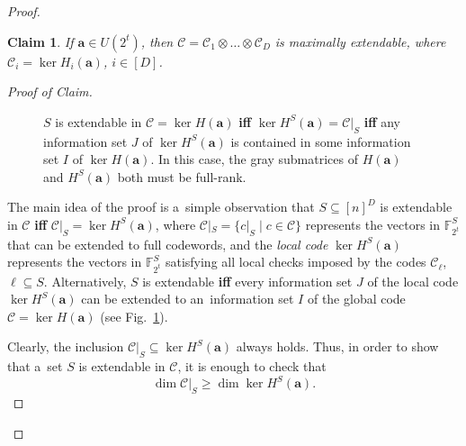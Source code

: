 \documentclass[conference]{IEEEtran}
\newcommand{\Iff}{\textbf{if\textcompwordmark f} }
\let\ge\geqslant
\theoremstyle{plain}
\newtheorem{claim}{Claim}[theorem]
\theoremstyle{definition}
\theoremstyle{remark}
\newcommand{\va}{\mathbf{a}}
\newcommand{\cC}{\mathcal{C}}
\newcommand{\F}{\mathbb{F}}
\begin{document}
\begin{proof}
    \begin{claim}\label{cl:MR-universal}
        If $\va\in U(2^t)$, then $\cC=\cC_1\otimes\dots \otimes \cC_D$ is maximally extendable, where $\cC_i = \ker H_i(\va)$, $i\in [D]$.
    \end{claim}
    \begin{proof}[Proof of Claim]
    \begin{figure}
        \centering
{}
        \caption{$S$ is extendable in $\cC=\ker H(\va)$ \Iff $\ker H^S(\va) = \cC|_S$ \Iff any information set $J$ of $\ker H^S(\va)$ is contained in some information set $I$ of $\ker H(\va)$. 
        In this case, the gray submatrices of $H(\va)$ and $H^S(\va)$ both must be full-rank.}
        \label{fig:extendable}
    \end{figure}

    The main idea of the proof is a~simple observation that $S\subseteq [n]^D$ is extendable in $\cC$ \Iff $\cC|_S = \ker H^S(\va)$, where $\cC|_S = \{c|_S \mid c \in \cC\}$ represents the vectors in $\F_{2^t}^S$ that can be extended to full codewords, and the \emph{local code} $\ker H^S(\va)$ represents the vectors in $\F_{2^t}^S$ satisfying all local checks imposed by the codes $\cC_\ell$, $\ell \subseteq S$. Alternatively, $S$ is extendable \Iff every information set $J$ of the local code $\ker H^S(\va)$ can be extended to an~information set $I$ of the global code $\cC = \ker H(\va)$ (see Fig.~\ref{fig:extendable}). 

    Clearly, the inclusion $\cC|_S \subseteq \ker H^S(\va)$ always holds. Thus, in order to show that a~set $S$ is extendable in $\cC$, it is enough to check that \begin{equation}\label{eqn:check-ext}
        \dim \cC|_S \ge \dim \ker H^S(\va).
    \end{equation}
    

\end{proof}
\end{proof}
\end{document}
